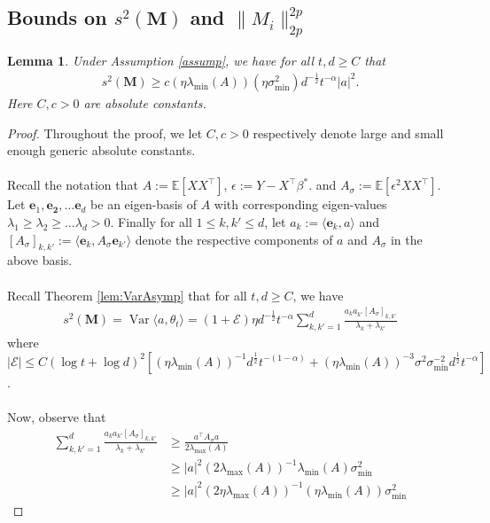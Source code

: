 \documentclass[11pt, reqno,english]{amsart}
\DeclareMathOperator{\Var}{Var} \DeclareMathOperator{\N}{N}
\newtheorem{lemma}{Lemma}[section]
\begin{document}
\subsection{Bounds on $s^2(\mathbf{M})$ and $\|M_i\|^{2p}_{2p}$}\label{useful}
\begin{lemma}\label{denominator}
Under Assumption \ref{assump}, we have for all $t, d \geq C$ that
\begin{align*}
s^2(\mathbf{M}) \geq c(\eta \lambda_{\min}(A))(\eta \sigma^2_{\min})d^{-\frac{1}{2}}t^{-\alpha}|a|^2.
\end{align*}
Here $C,c > 0$ are absolute constants.
\end{lemma}
\begin{proof}
Throughout the proof, we let $C, c > 0$ respectively denote large and small enough generic absolute constants.
\\\\
Recall the notation that $A := \mathbb{E}[XX^\top]$, $\epsilon := Y - X^\top \beta^*$. and $A_{\sigma} :=  \mathbb{E}[\epsilon^2 XX^\top]$.
Let $\mathbf{e}_1, \mathbf{e_2}, \dots \mathbf{e}_d$ be an eigen-basis of $A$ with corresponding eigen-values $\lambda_1 \geq \lambda_2 \geq \dots \lambda_d > 0$. Finally for all $1 \leq k, k' \leq d$, let $a_k := \langle \mathbf{e}_k, a \rangle$ and $[A_{\sigma}]_{k,k'} := \langle  \mathbf{e}_k, A_\sigma \mathbf{e}_{k'}\rangle$ denote the respective components of $a$ and $A_{\sigma}$ in the above basis.
\\\\
Recall Theorem \ref{lem:VarAsymp} that for all $t,d \geq C$, we have
\begin{align*}
    s^2(\mathbf{M}) = \Var \langle a, \theta_t \rangle = (1+\mathcal E)\eta d^{-\frac{1}{2}}t^{-\alpha}\sum_{k,k' = 1}^d \frac{a_k a_{k'}[A_{\sigma}]_{k,k'}}{\lambda_{k} + \lambda_{k'}}
\end{align*}
where $|\mathcal E| \leq C(\log t + \log d)^2 [(\eta \lambda_{\min}(A))^{-1}d^{\frac{1}{2}}t^{-(1-\alpha)} + (\eta \lambda_{\min}(A))^{-3}\sigma^2\sigma_{\min}^{-2}d^{\frac{1}{2}}t^{-\alpha}]$.
\\\\
Now, observe that
\begin{align*}
\sum_{k,k' = 1}^d \frac{a_ka_{k'}[A_{\sigma}]_{k,k'}}{\lambda_k + \lambda_{k'}} &\geq \frac{a^\top A_{\sigma} a}{2\lambda_{\max}(A)}
\\
&\geq |a|^2 (2\lambda_{\max}(A))^{-1}\lambda_{\min}(A)\sigma^2_{\min}
\\
&\geq |a|^2 (2\eta \lambda_{\max}(A))^{-1}(\eta \lambda_{\min}(A))\sigma^2_{\min}

\end{align*}
\end{proof}
\end{document}
